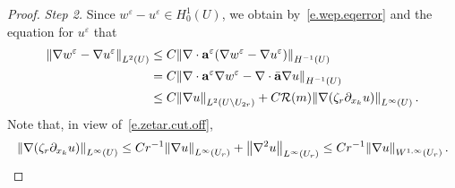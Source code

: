 \documentclass[11pt]{article} %
\numberwithin{equation}{section}
\theoremstyle{definition}
\let\originalleft\left
\let\originalright\right
\renewcommand{\left}{\mathopen{}\mathclose\bgroup\originalleft}
\renewcommand{\right}{\aftergroup\egroup\originalright}
\newcommand{\eps}{\varepsilon}
\newcommand{\ep}{\eps}
\renewcommand{\a}{\mathbf{a}}
\newcommand{\ahom}{\bar{\a}}
\begin{document}
\begin{proof}
\emph{Step 2.} 
Since $w^\ep - u^\ep \in H_0^1(U)$, we obtain by~\eqref{e.wep.eqerror} and the equation for $u^\ep$ that
\begin{align}
\label{e.wepuepest.a}
\left\| \nabla w^\ep - \nabla u^\ep  \right\|_{L^2 (U)} 
&
\leq
C \left\| \nabla \cdot \a^\ep (\nabla w^\ep - \nabla u^\ep ) \right\|_{H^{-1}(U)} 
\notag \\ & 
=
C \left\| \nabla \cdot \a^\ep \nabla w^\ep - \nabla \cdot \ahom \nabla u \right\|_{H^{-1}(U)} 
\notag \\ & 
\leq 
C \left\| \nabla u \right\|_{L^2(U \setminus U_{2r})}
+ 
C \mathcal{R}(m)
\left\| \nabla (\zeta_r \partial_{x_k} u) \right\|_{L^\infty(U)}  
\,.
\end{align}
Note that, in view of~\eqref{e.zetar.cut.off},  
\begin{equation}
\left\| \nabla (\zeta_r \partial_{x_k} u) \right\|_{L^\infty(U)}  
\leq
Cr^{-1} \left\| \nabla u \right\|_{L^\infty(U_r)}
+
\left\| \nabla^2 u \right\|_{L^\infty(U_r)} 
\leq 
C r^{-1} \left\| \nabla u \right\|_{W^{1,\infty}(U_r)}
\,.
\end{equation}


\smallskip


\end{proof}
\end{document}
